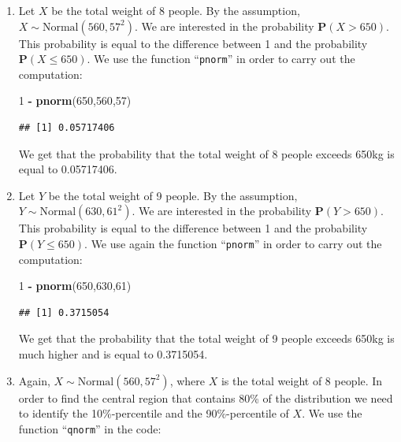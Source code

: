 \documentclass[
]{krantz}
\makeatletter
\newenvironment{Shaded}{\begin{snugshade}}{\end{snugshade}}
\newcommand{\DecValTok}[1]{\textcolor[rgb]{0.00,0.00,0.81}{#1}}
\newcommand{\KeywordTok}[1]{\textcolor[rgb]{0.13,0.29,0.53}{\textbf{#1}}}
\newcommand{\NormalTok}[1]{#1}
\newcommand{\OperatorTok}[1]{\textcolor[rgb]{0.81,0.36,0.00}{\textbf{#1}}}
\newcommand{\StringTok}[1]{\textcolor[rgb]{0.31,0.60,0.02}{#1}}
\newcommand{\Prob}{\mathbf{P}}
\newenvironment{kframe}{%
\medskip{}
\setlength{\fboxsep}{.8em}
 \def\at@end@of@kframe{}%
 \ifinner\ifhmode%
  \def\at@end@of@kframe{\end{minipage}}%
  \begin{minipage}{\columnwidth}%
 \fi\fi%
 \def\FrameCommand##1{\hskip\@totalleftmargin \hskip-\fboxsep
 \colorbox{shadecolor}{##1}\hskip-\fboxsep
     \hskip-\linewidth \hskip-\@totalleftmargin \hskip\columnwidth}%
 \MakeFramed {\advance\hsize-\width
   \@totalleftmargin\z@ \linewidth\hsize
   \@setminipage}}%
 {\par\unskip\endMakeFramed%
 \at@end@of@kframe}
\renewenvironment{Shaded}{\begin{kframe}}{\end{kframe}}
\theoremstyle{definition}
\theoremstyle{definition}
\theoremstyle{definition}
\theoremstyle{remark}
\makeatother
\begin{document}
\begin{enumerate}
\def\labelenumi{\arabic{enumi}.}
\item
  Let \(X\) be the total weight of 8
  people. By the assumption, \(X \sim \mbox{Normal}(560, 57^2)\). We are
  interested in the probability \(\Prob(X > 650)\). This probability is
  equal to the difference between 1 and the probability
  \(\Prob(X \leq 650)\). We use the function ``\texttt{pnorm}'' in order to carry out
  the computation:

\begin{Shaded}
\begin{Highlighting}[]
\DecValTok{1} \OperatorTok{-}\StringTok{ }\KeywordTok{pnorm}\NormalTok{(}\DecValTok{650}\NormalTok{,}\DecValTok{560}\NormalTok{,}\DecValTok{57}\NormalTok{)}
\end{Highlighting}
\end{Shaded}

\begin{verbatim}
## [1] 0.05717406
\end{verbatim}

  We get that the probability that the total weight of 8 people exceeds
  650kg is equal to 0.05717406.
\item
  Let \(Y\) be the total weight of 9
  people. By the assumption, \(Y \sim \mbox{Normal}(630, 61^2)\). We are
  interested in the probability \(\Prob(Y > 650)\). This probability is
  equal to the difference between 1 and the probability
  \(\Prob(Y \leq 650)\). We use again the function ``\texttt{pnorm}'' in order to
  carry out the computation:

\begin{Shaded}
\begin{Highlighting}[]
\DecValTok{1} \OperatorTok{-}\StringTok{ }\KeywordTok{pnorm}\NormalTok{(}\DecValTok{650}\NormalTok{,}\DecValTok{630}\NormalTok{,}\DecValTok{61}\NormalTok{)}
\end{Highlighting}
\end{Shaded}

\begin{verbatim}
## [1] 0.3715054
\end{verbatim}

  We get that the probability that the total weight of 9 people exceeds
  650kg is much higher and is equal to 0.3715054.
\item
  Again,
  \(X \sim \mbox{Normal}(560, 57^2)\), where \(X\) is the total weight of 8
  people. In order to find the central region that contains 80\% of the
  distribution we need to identify the 10\%-percentile and the
  90\%-percentile of \(X\). We use the function ``\texttt{qnorm}'' in the code:


\end{enumerate}
\end{document}
